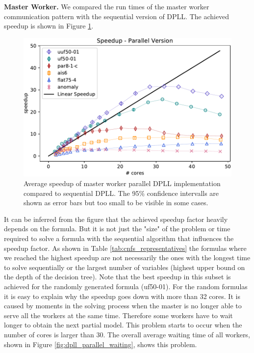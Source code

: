 \documentclass[letterpaper]{article}
\newcommand{\mypar}[1]{{\bf #1.}}
\begin{document}
\mypar{Master Worker}
We compared the run times of the master worker communication pattern with the sequential version of DPLL.
The achieved speedup is shown in Figure \ref{fig:dpll_parallel_speedup}.
\begin{figure}
    \centering
    \includegraphics[width=\columnwidth]{figures/scaling_parallel_subset_dpll_scaling_tar.pdf}
    \caption{Average speedup of master worker parallel DPLL implementation compared to sequential DPLL.
    The 95\% confidence intervalls are shown as error bars but too small to be visible in some cases.
    \label{fig:dpll_parallel_speedup}}
\end{figure}
It can be inferred from the figure that the achieved speedup factor heavily depends on the formula.
But it is not just the "size" of the problem or time required to solve a formula with the sequential algorithm that influences the speedup factor.
As shown in Table \ref{tab:cnfs_representatives} the formulas where we reached the highest speedup are not necessarily the ones with the longest time to solve sequentially or the largest number of variables (highest upper bound on the depth of the decision tree).
Note that the best speedup in this subset is achieved for the randomly generated formula (uf50-01).
For the random formulas it is easy to explain why the speedup goes down with more than 32 cores.
It is caused by moments in the solving process when the master is no longer able to serve all the workers at the same time.
Therefore some workers have to wait longer to obtain the next partial model.
This problem starts to occur when the number of cores is larger than 30.
The overall average waiting time of all workers, shown in Figure \ref{fig:dpll_parallel_waiting}, shows this problem.
\end{document}
